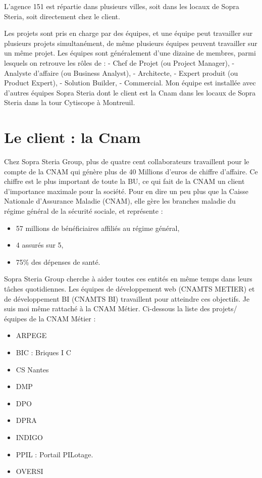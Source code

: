 L'agence 151 est répartie dans plusieurs villes, soit dans les locaux de Sopra Steria, soit directement chez le client.

Les projets sont pris en charge par des équipes, et une équipe peut travailler sur plusieurs projets simultanément, de même plusieurs équipes peuvent travailler sur un même projet. Les équipes sont généralement d’une dizaine de membres, parmi lesquels on retrouve les rôles de :
- Chef de Projet (ou Project Manager),
- Analyste d’affaire (ou Business Analyst),
- Architecte,
- Expert produit (ou Product Expert),
- Solution Builder,
- Commercial.
Mon équipe est installée avec d'autres équipes Sopra Steria dont le client est la Cnam dans les locaux de Sopra Steria dans la tour Cytiscope à Montreuil. 

\section{Le client : la Cnam}

Chez Sopra Steria Group, plus de quatre cent collaborateurs travaillent pour le compte de la CNAM qui génère plus de 40 Millions d’euros de chiffre d’affaire. Ce chiffre est le plus important de toute la BU, ce qui fait de la CNAM un client d’importance maximale pour la société. Pour en dire un peu plus que la Caisse Nationale d’Assurance Maladie (CNAM), elle gère les branches maladie du régime général de la sécurité sociale, et représente :

\begin{itemize}
    \item 57 millions de bénéficiaires affiliés au régime général, 
    \item 4 assurés sur 5, 
    \item 75\% des dépenses de santé. 
\end{itemize}

Sopra Steria Group cherche à aider toutes ces entités en même temps dans leurs tâches quotidiennes. Les équipes de développement web (CNAMTS METIER) et de développement BI (CNAMTS BI) travaillent pour atteindre ces objectifs. Je suis moi même rattaché à la CNAM Métier. Ci-dessous la liste des projets/équipes de la CNAM Métier :

\begin{itemize}
    \item ARPEGE
    \item BIC : Briques I C
    \item CS Nantes
    \item DMP
    \item DPO
    \item DPRA
    \item INDIGO
    \item PPIL : Portail PILotage.
    \item OVERSI
\end{itemize}

